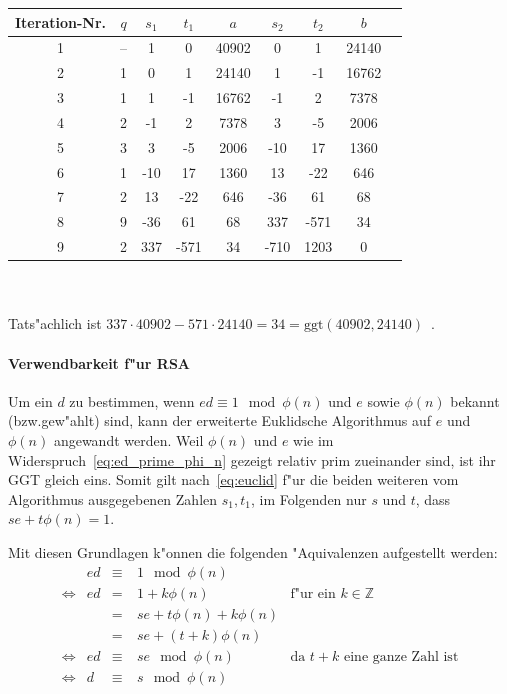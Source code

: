 \documentclass[12pt]{article}
\begin{document}
\begin{tabular}{c|c c c c c c c l}
    Iteration-Nr. & $q$ & $s_1$ & $t_1$ & $a$ & $s_2$ & $t_2$ & $b$ \\
    \hline
    1 & -- & 1 & 0 & 40902 & 0 & 1 & 24140 \\
    2 & 1 & 0 & 1 & 24140 & 1 & -1 & 16762 \\
    3 & 1 & 1 & -1 & 16762 & -1 & 2 & 7378 \\
    4 & 2 & -1 & 2 & 7378 & 3 & -5 & 2006 \\
    5 & 3 & 3 & -5 & 2006 & -10 & 17 & 1360 \\
    6 & 1 & -10 & 17 & 1360 & 13 & -22 & 646 \\
    7 & 2 & 13 & -22 & 646 & -36 & 61 & 68 \\
    8 & 9 & -36 & 61 & 68 & 337 & -571 & 34 \\
    9 & 2 & 337 & -571 & 34 & -710 & 1203 & 0 \\
\end{tabular}
~\\~\\
\noindent
Tats"achlich ist $337 \cdot 40902 - 571 \cdot 24140 = 34 = \textrm{ggt}(40902, 24140)$~\cite{taocp2}.

\paragraph{Verwendbarkeit f"ur RSA}

Um ein $d$ zu bestimmen, wenn $ed \equiv 1 \mod \phi(n) $ und $e$ sowie $\phi(n)$ bekannt (bzw.\@ gew"ahlt) sind,
kann der erweiterte Euklidsche Algorithmus auf $e$ und $\phi(n)$ angewandt werden.
Weil $\phi(n)$ und $e$ wie im Widerspruch~\eqref{eq:ed_prime_phi_n} gezeigt relativ prim zueinander sind, ist ihr GGT gleich eins.
Somit gilt nach~\eqref{eq:euclid} f"ur die beiden weiteren vom Algorithmus ausgegebenen Zahlen $s_1, t_1$,
im Folgenden nur $s$ und $t$, dass $se + t\phi(n) = 1$.

\noindent Mit diesen Grundlagen k"onnen die folgenden "Aquivalenzen aufgestellt werden:
\begin{equation}
\label{eq:d_is_s}
\begin{aligned}
      &ed &\equiv&~1 \mod \phi(n)& \\
      \iff&ed &=&~1 + k \phi(n) &\textrm{f"ur ein }k \in \mathbb{Z}\\
      &&=&~se + t\phi(n) + k\phi(n)& \\
      &&=&~se + (t+k)\phi(n) &\\
      \iff& ed &\equiv&~se \mod \phi(n) &\textrm{da }t+k\textrm{ eine ganze Zahl ist}\\
      \iff& d &\equiv&~s \mod \phi(n)
\end{aligned}
\end{equation}
\end{document}
